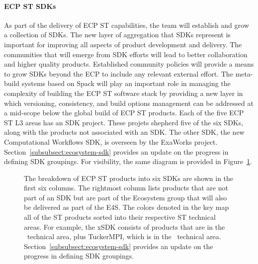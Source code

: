 \paragraph{ECP ST SDKs}
As part of the delivery of ECP ST capabilities, the team will establish and grow a collection of SDKs. The new layer of aggregation that SDKs represent is important for improving all aspects of product development and delivery. The communities that will emerge from SDK efforts will lead to better collaboration and higher quality products. Established community policies will provide a means to grow SDKs beyond the ECP to include any relevant external effort. The meta-build systems based on Spack will play an important role in managing the complexity of building the ECP ST software stack by providing a new layer in which versioning, consistency, and build options management can be addressed at a mid-scope below the global build of ECP ST products.
Each of the five ECP ST L3 areas has an SDK project. These projets shepherd five of the six SDKs, along with the products not associated with an SDK. The other SDK, the new Computational Workflows SDK, is overseen by the ExaWorks project. Section~\ref{subsubsect:ecosystem-sdk} provides an update on the progress in defining SDK groupings. For visibility, the same diagram is provided in Figure~\ref{fig:sdk-definition1-0}.

\begin{figure}[htb]
	\centering
	\caption{\label{fig:sdk-definition1-0}The breakdown of ECP ST products into six SDKs are shown in the first six columns. The rightmost column lists products that are not part of an SDK but are part of the Ecosystem group that will also be delivered as part of the E4S. The colors denoted in the key map all of the ST products sorted into their respective ST technical areas.  For example, the xSDK consists of products that are in the \mathlibs~technical area, plus TuckerMPI, which is in the \ecosystem~technical area.  Section~\ref{subsubsect:ecosystem-sdk} provides an update on the progress in defining SDK groupings.}
    \protect{}
\end{figure}



